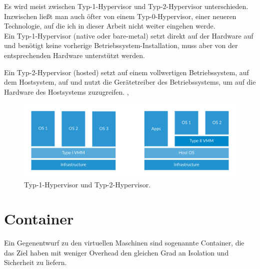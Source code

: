 \noindent Es wird meist zwischen Typ-1-Hypervisor und Typ-2-Hypervisor unterschieden. Inzwischen ließt man auch öfter von einem Typ-0-Hypervisor, einer neueren Technologie, auf die ich in dieser Arbeit nicht weiter eingehen werde.\\

\noindent Ein Typ-1-Hypervisor (native oder bare-metal) setzt direkt auf der Hardware auf und benötigt keine vorherige Betriebssystem-Installation, muss aber von der entsprechenden Hardware unterstützt werden.

\vspace{\baselineskip}

\noindent Ein Typ-2-Hypervisor (hosted) setzt auf einem vollwertigen Betriebssystem, auf dem Hostsystem, auf und nutzt die Gerätetreiber des Betriebssystems, um auf die Hardware des Hostsystems zuzugreifen. \cite{wiki:hyper}, \cite{6903537}\\

\begin{figure}[!ht] %
  \centering
  \includegraphics[width=1\textwidth]{images/hypervisors.png}
  \caption{Typ-1-Hypervisor und Typ-2-Hypervisor. \cite{wiki:hyper}}
\end{figure}


\section{Container}
Ein Gegenentwurf zu den virtuellen Maschinen sind sogenannte Container, die das Ziel haben mit weniger Overhead den gleichen Grad an Isolation und Sicherheit zu liefern.

